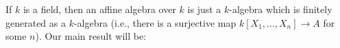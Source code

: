 If $k$ is a field, then an affine algebra over $k$ is just a $k$-algebra
which is finitely generated as a $k$-algebra (i.e., there is a surjective map
$k[X_1, \ldots, X_n] \to A$ for some $n$). Our main result will be:
